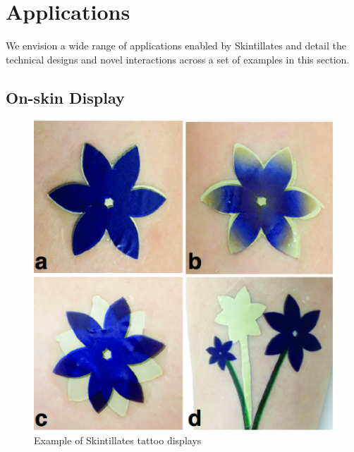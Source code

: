 \documentclass{sigchi}
\begin{document}
\section{Applications}
We envision a wide range of applications enabled by Skintillates and detail the technical designs and novel interactions across a set of examples in this section.

\subsection{On-skin Display}
\begin{figure}
\centering
\includegraphics[width=0.8\columnwidth]{figures/Figure5}
\caption{Example of Skintillates tattoo displays}
\vspace{-8pt}
\label{fig:design}
\end{figure}
\end{document}
